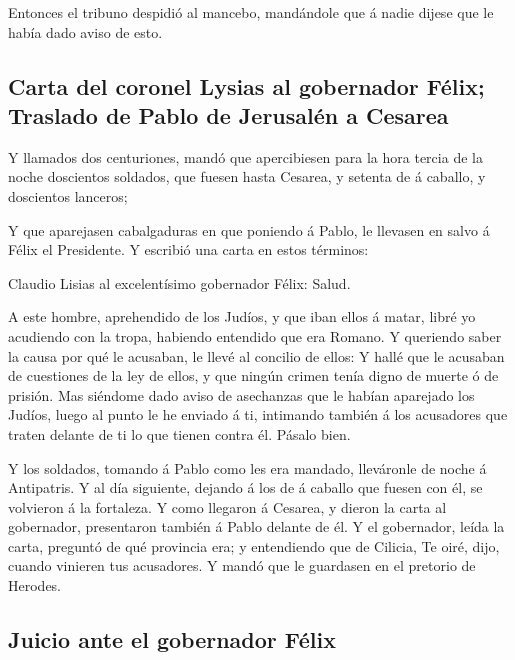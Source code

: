  Entonces el tribuno despidió al mancebo, mandándole que
á nadie dijese que le había dado aviso de esto.

\hypertarget{carta-del-coronel-lysias-al-gobernador-fuxe9lix-traslado-de-pablo-de-jerusaluxe9n-a-cesarea}{%
\subsection{Carta del coronel Lysias al gobernador Félix; Traslado de
Pablo de Jerusalén a
Cesarea}\label{carta-del-coronel-lysias-al-gobernador-fuxe9lix-traslado-de-pablo-de-jerusaluxe9n-a-cesarea}}

 Y llamados dos centuriones, mandó que apercibiesen para
la hora tercia de la noche doscientos soldados, que fuesen hasta
Cesarea, y setenta de á caballo, y doscientos lanceros;

 Y que aparejasen cabalgaduras en que poniendo á Pablo,
le llevasen en salvo á Félix el Presidente.  Y escribió
una carta en estos términos:

 Claudio Lisias al excelentísimo gobernador Félix: Salud.

 A este hombre, aprehendido de los Judíos, y que iban
ellos á matar, libré yo acudiendo con la tropa, habiendo entendido que
era Romano.  Y queriendo saber la causa por qué le
acusaban, le llevé al concilio de ellos:  Y hallé que le
acusaban de cuestiones de la ley de ellos, y que ningún crimen tenía
digno de muerte ó de prisión.  Mas siéndome dado aviso de
asechanzas que le habían aparejado los Judíos, luego al punto le he
enviado á ti, intimando también á los acusadores que traten delante de
ti lo que tienen contra él. Pásalo bien.

 Y los soldados, tomando á Pablo como les era mandado,
lleváronle de noche á Antipatris.  Y al día siguiente,
dejando á los de á caballo que fuesen con él, se volvieron á la
fortaleza.  Y como llegaron á Cesarea, y dieron la carta
al gobernador, presentaron también á Pablo delante de él.
 Y el gobernador, leída la carta, preguntó de qué
provincia era; y entendiendo que de Cilicia,  Te oiré,
dijo, cuando vinieren tus acusadores. Y mandó que le guardasen en el
pretorio de Herodes.

\hypertarget{juicio-ante-el-gobernador-fuxe9lix}{%
\subsection{Juicio ante el gobernador
Félix}\label{juicio-ante-el-gobernador-fuxe9lix}}

